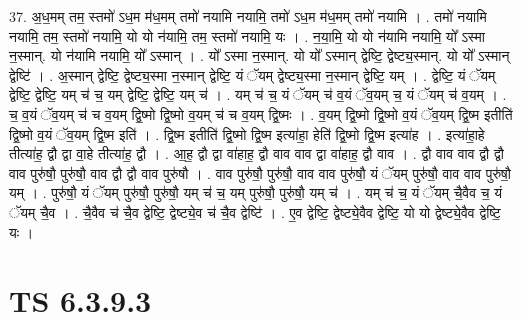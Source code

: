 \documentclass[17pt]{extarticle}
\begin{document}
37. अ॒ध॒मम् तम॒ स्तमो॑ ऽध॒म म॑ध॒मम् तमो॑ नयामि नयामि॒ तमो॑ ऽध॒म म॑ध॒मम् तमो॑ नयामि । . तमो॑ नयामि नयामि॒ तम॒ स्तमो॑ नयामि॒ यो यो न॑यामि॒ तम॒ स्तमो॑ नयामि॒ यः । . न॒या॒मि॒ यो यो न॑यामि नयामि॒ यो᳚ ऽस्मा न॒स्मान्. यो न॑यामि नयामि॒ यो᳚ ऽस्मान् । . यो᳚ ऽस्मा न॒स्मान्. यो यो᳚ ऽस्मान् द्वेष्टि॒ द्वेष्ट्य॒स्मान्. यो यो᳚ ऽस्मान् द्वेष्टि॑ । . अ॒स्मान् द्वेष्टि॒ द्वेष्ट्य॒स्मा न॒स्मान् द्वेष्टि॒ यं ॅयम् द्वेष्ट्य॒स्मा न॒स्मान् द्वेष्टि॒ यम् । . द्वेष्टि॒ यं ॅयम् द्वेष्टि॒ द्वेष्टि॒ यम् च॑ च॒ यम् द्वेष्टि॒ द्वेष्टि॒ यम् च॑ । . यम् च॑ च॒ यं ॅयम् च॑ व॒यं ॅव॒यम् च॒ यं ॅयम् च॑ व॒यम् । . च॒ व॒यं ॅव॒यम् च॑ च व॒यम् द्वि॒ष्मो द्वि॒ष्मो व॒यम् च॑ च व॒यम् द्वि॒ष्मः । . व॒यम् द्वि॒ष्मो द्वि॒ष्मो व॒यं ॅव॒यम् द्वि॒ष्म इतीति॑ द्वि॒ष्मो व॒यं ॅव॒यम् द्वि॒ष्म इति॑ । . द्वि॒ष्म इतीति॑ द्वि॒ष्मो द्वि॒ष्म इत्या॑हा॒ हेति॑ द्वि॒ष्मो द्वि॒ष्म इत्या॑ह । . इत्या॑हा॒हे तीत्या॑ह॒ द्वौ द्वा वा॒हे तीत्या॑ह॒ द्वौ । . आ॒ह॒ द्वौ द्वा वा॑हाह॒ द्वौ वाव वाव द्वा वा॑हाह॒ द्वौ वाव । . द्वौ वाव वाव द्वौ द्वौ वाव पुरु॑षौ॒ पुरु॑षौ॒ वाव द्वौ द्वौ वाव पुरु॑षौ । . वाव पुरु॑षौ॒ पुरु॑षौ॒ वाव वाव पुरु॑षौ॒ यं ॅयम् पुरु॑षौ॒ वाव वाव पुरु॑षौ॒ यम् । . पुरु॑षौ॒ यं ॅयम् पुरु॑षौ॒ पुरु॑षौ॒ यम् च॑ च॒ यम् पुरु॑षौ॒ पुरु॑षौ॒ यम् च॑ । . यम् च॑ च॒ यं ॅयम् चै॒वैव च॒ यं ॅयम् चै॒व । . चै॒वैव च॑ चै॒व द्वेष्टि॒ द्वेष्ट्ये॒व च॑ चै॒व द्वेष्टि॑ । . ए॒व द्वेष्टि॒ द्वेष्ट्ये॒वैव द्वेष्टि॒ यो यो द्वेष्ट्ये॒वैव द्वेष्टि॒ यः । \newline
\pagebreak
{}

\section{ TS 6.3.9.3 }
\end{document}
